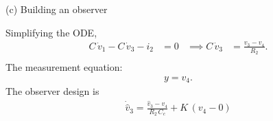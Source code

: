 

(c) Building an observer 

Simplifying the ODE, 
\begin{align*}
    C\,\dot v_1 -C\,\dot v_3 - i_2 &= 0 & \implies C\,\dot v_3 &= \frac{v_3 - v_4}{R_2}.\\
\end{align*}
The measurement equation:
\begin{align*}
    y = v_4.
\end{align*}
The observer design is 
\begin{align*}
    \dot{\hat v}_3 = \frac{\hat v_3 - v_4}{R_2\,C_c} + K\,\left(v_4 - 0\right)
\end{align*}

